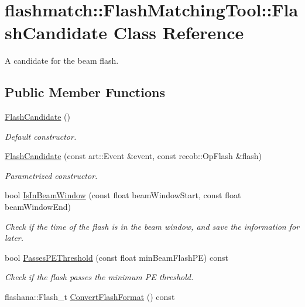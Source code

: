\hypertarget{classflashmatch_1_1FlashMatchingTool_1_1FlashCandidate}{\section{flashmatch\-:\-:Flash\-Matching\-Tool\-:\-:Flash\-Candidate Class Reference}
\label{classflashmatch_1_1FlashMatchingTool_1_1FlashCandidate}
}


A candidate for the beam flash.  


\subsection*{Public Member Functions}
\begin{DoxyCompactItemize}
\item 
\hypertarget{classflashmatch_1_1FlashMatchingTool_1_1FlashCandidate_a2d514815c7f1cd16cec72f45781b9532}{\hyperlink{classflashmatch_1_1FlashMatchingTool_1_1FlashCandidate_a2d514815c7f1cd16cec72f45781b9532}{Flash\-Candidate} ()}\label{classflashmatch_1_1FlashMatchingTool_1_1FlashCandidate_a2d514815c7f1cd16cec72f45781b9532}

\begin{DoxyCompactList}\small\item\em Default constructor. \end{DoxyCompactList}\item 
\hyperlink{classflashmatch_1_1FlashMatchingTool_1_1FlashCandidate_a95fa2be25e8635d56d6768b2886fa821}{Flash\-Candidate} (const art\-::\-Event \&event, const recob\-::\-Op\-Flash \&flash)
\begin{DoxyCompactList}\small\item\em Parametrized constructor. \end{DoxyCompactList}\item 
bool \hyperlink{classflashmatch_1_1FlashMatchingTool_1_1FlashCandidate_abe37a111abddadacef277af4f8adda44}{Is\-In\-Beam\-Window} (const float beam\-Window\-Start, const float beam\-Window\-End)
\begin{DoxyCompactList}\small\item\em Check if the time of the flash is in the beam window, and save the information for later. \end{DoxyCompactList}\item 
bool \hyperlink{classflashmatch_1_1FlashMatchingTool_1_1FlashCandidate_a43b731e560f75645df5aa5d74f017ba0}{Passes\-P\-E\-Threshold} (const float min\-Beam\-Flash\-P\-E) const 
\begin{DoxyCompactList}\small\item\em Check if the flash passes the minimum P\-E threshold. \end{DoxyCompactList}\item 
flashana\-::\-Flash\-\_\-t \hyperlink{classflashmatch_1_1FlashMatchingTool_1_1FlashCandidate_ab8156ee16d27febb44352c4ffd6adf56}{Convert\-Flash\-Format} () const 
\end{DoxyCompactItemize}
